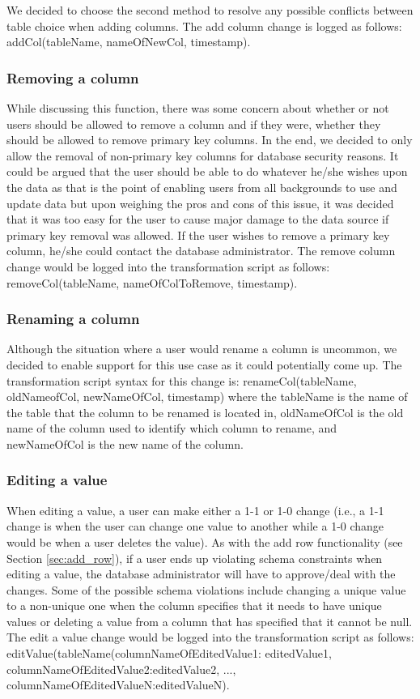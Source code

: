 \documentclass[12pt]{article}
\begin{document}
We decided to choose the second method to resolve any possible conflicts between table choice when adding columns. The add column change is logged as follows: addCol(tableName, nameOfNewCol, timestamp). 

\subsubsection{Removing a column}
\label{sec:remove_col}
While discussing this function, there was some concern about whether or not users should be allowed to remove a column and if they were, whether they should be allowed to remove primary key columns. In the end, we decided to only allow the removal of non-primary key columns for database security reasons. It could be argued that the user should be able to do whatever he/she wishes upon the data as that is the point of enabling users from all backgrounds to use and update data but upon weighing the pros and cons of this issue, it was decided that it was too easy for the user to cause major damage to the data source if primary key removal was allowed. If the user wishes to remove a primary key column, he/she could contact the database administrator. The remove column change would be logged into the transformation script as follows: removeCol(tableName, nameOfColToRemove, timestamp).

\subsubsection{Renaming a column}
\label{sec:rename_col}
Although the situation where a user would rename a column is uncommon, we decided to enable support for this use case as it could potentially come up. The transformation script syntax for this change is: renameCol(tableName, oldNameofCol, newNameOfCol, timestamp) where the tableName is the name of the table that the column to be renamed is located in, oldNameOfCol is the old name of the column used to identify which column to rename, and newNameOfCol is the new name of the column.

\subsubsection{Editing a value}
\label{sec:edit_value}
When editing a value, a user can make either a 1-1 or 1-0 change (i.e., a 1-1 change is when the user can change one value to another while a 1-0 change would be when a user deletes the value). As with the add row functionality (see Section \ref{sec:add_row}), if a user ends up violating schema constraints when editing a value, the database administrator will have to approve/deal with the changes. Some of the possible schema violations include changing a unique value to a non-unique one when the column specifies that it needs to have unique values or deleting a value from a column that has specified that it cannot be null. The edit a value change would be logged into the transformation script as follows: editValue(tableName(columnNameOfEditedValue1: editedValue1, columnNameOfEditedValue2:editedValue2, ..., columnNameOfEditedValueN:editedValueN).
\end{document}
